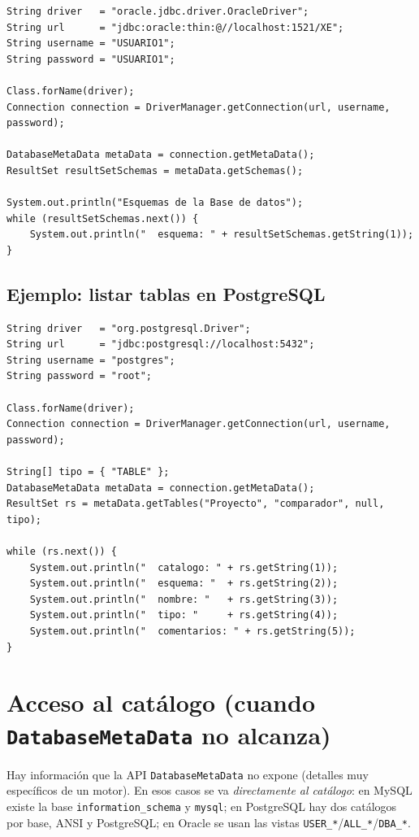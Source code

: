 \documentclass[11pt,a4paper]{article}
\begin{document}
\begin{lstlisting}
String driver   = "oracle.jdbc.driver.OracleDriver";
String url      = "jdbc:oracle:thin:@//localhost:1521/XE";
String username = "USUARIO1";
String password = "USUARIO1";

Class.forName(driver);
Connection connection = DriverManager.getConnection(url, username, password);

DatabaseMetaData metaData = connection.getMetaData();
ResultSet resultSetSchemas = metaData.getSchemas();

System.out.println("Esquemas de la Base de datos");
while (resultSetSchemas.next()) {
    System.out.println("  esquema: " + resultSetSchemas.getString(1));
}
\end{lstlisting}

\subsection*{Ejemplo: listar tablas en PostgreSQL}

\begin{lstlisting}
String driver   = "org.postgresql.Driver";
String url      = "jdbc:postgresql://localhost:5432";
String username = "postgres";
String password = "root";

Class.forName(driver);
Connection connection = DriverManager.getConnection(url, username, password);

String[] tipo = { "TABLE" };
DatabaseMetaData metaData = connection.getMetaData();
ResultSet rs = metaData.getTables("Proyecto", "comparador", null, tipo);

while (rs.next()) {
    System.out.println("  catalogo: " + rs.getString(1));
    System.out.println("  esquema: "  + rs.getString(2));
    System.out.println("  nombre: "   + rs.getString(3));
    System.out.println("  tipo: "     + rs.getString(4));
    System.out.println("  comentarios: " + rs.getString(5));
}
\end{lstlisting}

\section{Acceso al catálogo (cuando \texttt{DatabaseMetaData} no alcanza)}

Hay información que la API \texttt{DatabaseMetaData} no expone
(detalles muy específicos de un motor). En esos casos se va
\emph{directamente al catálogo}: en MySQL existe la base
\texttt{information\_schema} y \texttt{mysql}; en PostgreSQL hay dos
catálogos por base, ANSI y PostgreSQL; en Oracle se usan las vistas
\texttt{USER\_*}/\texttt{ALL\_*}/\texttt{DBA\_*}.
\end{document}
